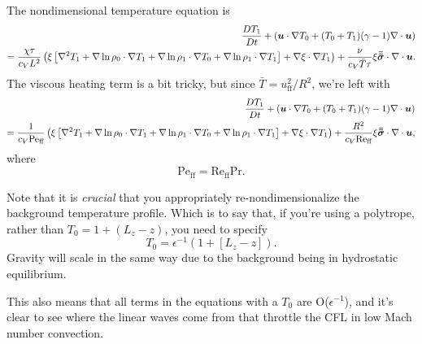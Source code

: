 The nondimensional temperature equation is
\begin{gather}
\begin{split}
\frac{D T_1}{Dt} + \left(\bm{u}\cdot\nabla T_0 + (T_0 + T_1)(\gamma-1)\nabla\cdot\bm{u}\right)
\\= \frac{\chi \tau}{c_V L^2}\left(\xi\left[\nabla^2 T_1 + \nabla\ln\rho_0\cdot\nabla T_1 + \nabla\ln\rho_1 \cdot\nabla T_0 + \nabla\ln\rho_1\cdot\nabla T_1\right] + \nabla\xi\cdot\nabla T_1\right)
 + \frac{\nu}{c_V \bar{T} \tau }\xi\bm{\bar{\bar{\sigma}}}\cdot\nabla\cdot\bm{u}.
\end{split}
\end{gather}
The viscous heating term is a bit tricky, but since $\bar{T} = u_{\text{ff}}^2/R^2$, we're left with
\begin{equation}
\begin{split}
\frac{D T_1}{Dt} + \left(\bm{u}\cdot\nabla T_0 + (T_0 + T_1)(\gamma-1)\nabla\cdot\bm{u}\right)
\\= \frac{1}{c_V \text{Pe}_{\text{ff}}}\left(\xi\left[\nabla^2 T_1 + \nabla\ln\rho_0\cdot\nabla T_1 + \nabla\ln\rho_1 \cdot\nabla T_0 + \nabla\ln\rho_1\cdot\nabla T_1\right] + \nabla\xi\cdot\nabla T_1\right)
 + \frac{R^2}{c_V \text{Re}_{\text{ff}} }\xi\bm{\bar{\bar{\sigma}}}\cdot\nabla\cdot\bm{u},
\end{split}
\end{equation}
where
$$
\text{Pe}_{\text{ff}} = \text{Re}_{\text{ff}}\text{Pr}.
$$

Note that it is \emph{crucial} that you appropriately re-nondimensionalize the background temperature profile.
Which is to say that, if you're using a polytrope, rather than $T_0 = 1 + (L_z - z)$, you need to specify
$$
T_0 = \epsilon^{-1}\left(1 + [L_z - z]\right).
$$
Gravity will scale in the same way due to the background being in hydrostatic equilibrium.

This also means that all terms in the equations with a $T_0$ are O($\epsilon^{-1}$), and it's clear to see where the linear waves come from that throttle the CFL in low Mach number convection.


